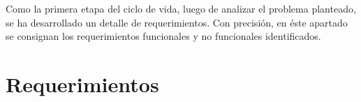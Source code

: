 Como la primera etapa del ciclo de vida, luego de analizar el problema planteado, se ha desarrollado un detalle de requerimientos. Con precisión, en éste apartado se consignan los requerimientos funcionales y no funcionales identificados.

\section{Requerimientos}
